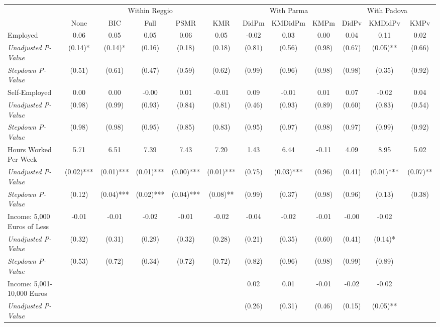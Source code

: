 \begin{tabular}{l c c c c c c c c c c c}
\toprule
& \multicolumn{5}{c}{Within Reggio} & \multicolumn{3}{c}{With Parma} & \multicolumn{3}{c}{With Padova} \\\cmidrule(lr){2-6} \cmidrule(lr){7-9} \cmidrule(lr){10-12}
 & None & BIC & Full & PSMR & KMR & DidPm & KMDidPm & KMPm & DidPv & KMDidPv & KMPv \\
\midrule
Employed & 0.06 & 0.05 & 0.05 & 0.06 & 0.05 & -0.02 & 0.03 & 0.00 & 0.04 & 0.11 & 0.02 \\
\quad \textit{Unadjusted P-Value} & (0.14)* & (0.14)* & (0.16) & (0.18) & (0.18) & (0.81) & (0.56) & (0.98) & (0.67) & (0.05)** & (0.66) \\
\quad \textit{Stepdown P-Value} & (0.51) & (0.61) & (0.47) & (0.59) & (0.62) & (0.99) & (0.96) & (0.98) & (0.98) & (0.35) & (0.92) \\
Self-Employed & 0.00 & 0.00 & -0.00 & 0.01 & -0.01 & 0.09 & -0.01 & 0.01 & 0.07 & -0.02 & 0.04 \\
\quad \textit{Unadjusted P-Value} & (0.98) & (0.99) & (0.93) & (0.84) & (0.81) & (0.46) & (0.93) & (0.89) & (0.60) & (0.83) & (0.54) \\
\quad \textit{Stepdown P-Value} & (0.98) & (0.98) & (0.95) & (0.85) & (0.83) & (0.95) & (0.97) & (0.98) & (0.97) & (0.99) & (0.92) \\
Hours Worked Per Week & 5.71 & 6.51 & 7.39 & 7.43 & 7.20 & 1.43 & 6.44 & -0.11 & 4.09 & 8.95 & 5.02 \\
\quad \textit{Unadjusted P-Value} & (0.02)*** & (0.01)*** & (0.01)*** & (0.00)*** & (0.01)*** & (0.75) & (0.03)*** & (0.96) & (0.41) & (0.01)*** & (0.07)** \\
\quad \textit{Stepdown P-Value} & (0.12) & (0.04)*** & (0.02)*** & (0.04)*** & (0.08)** & (0.99) & (0.37) & (0.98) & (0.96) & (0.13) & (0.38) \\
Income: 5,000 Euros of Less & -0.01 & -0.01 & -0.02 & -0.01 & -0.02 & -0.04 & -0.02 & -0.01 & -0.00 & -0.02 &  \\
\quad \textit{Unadjusted P-Value} & (0.32) & (0.31) & (0.29) & (0.32) & (0.28) & (0.21) & (0.35) & (0.60) & (0.41) & (0.14)* & \\
\quad \textit{Stepdown P-Value} & (0.53) & (0.72) & (0.34) & (0.72) & (0.72) & (0.82) & (0.96) & (0.98) & (0.99) & (0.89) &  \\
Income: 5,001-10,000 Euros &  &  &  &  &  & 0.02 & 0.01 & -0.01 & -0.02 & -0.02 &  \\
\quad \textit{Unadjusted P-Value} & & & & & & (0.26) & (0.31) & (0.46) & (0.15) & (0.05)** & \\

\end{tabular}
